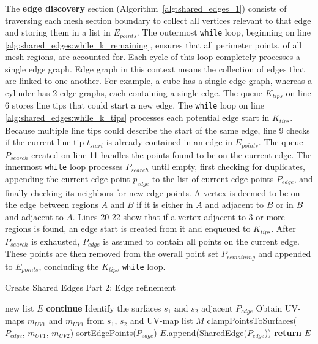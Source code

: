 The \textbf{edge discovery} section (Algorithm~\ref{alg:shared_edges_1}) consists of traversing each mesh section boundary to collect all vertices relevant to that edge and storing them in a list in $E_{points}$.
The outermost \verb|while| loop, beginning on line \ref{alg:shared_edges:while_k_remaining}, ensures that all perimeter points, of all mesh regions, are accounted for.
Each cycle of this loop completely processes a single edge graph.
Edge graph in this context means the collection of edges that are linked to one another.
For example, a cube has a single edge graph, whereas a cylinder has 2 edge graphs, each containing a single edge.
The queue $K_{tips}$ on line 6 stores line tips that could start a new edge.
The \verb|while| loop on line \ref{alg:shared_edges:while_k_tips} processes each potential edge start in $K_{tips}$.
Because multiple line tips could describe the start of the same edge, line 9 checks if the current line tip $t_{start}$ is already contained in an edge in $E_{points}$.
The queue $P_{search}$ created on line 11 handles the points found to be on the current edge.
The innermost \verb|while| loop processes $P_{search}$ until empty, first checking for duplicates, appending the current edge point $p_{edge}$ to the list of current edge points $P_{edge}$, and finally checking its neighbors for new edge points.
A vertex is deemed to be on the edge between regions $A$ and $B$ if it is either in $A$ and adjacent to $B$ or in $B$ and adjacent to $A$.
Lines 20-22 show that if a vertex adjacent to 3 or more regions is found, an edge start is created from it and enqueued to $K_{tips}$.
After $P_{search}$ is exhausted, $P_{edge}$ is assumed to contain all points on the current edge.
These points are then removed from the overall point set $P_{remaining}$ and appended to $E_{points}$, concluding the $K_{tips}$ \verb|while| loop.

\begin{algorithm}[htb]
	\caption{Create Shared Edges Part 2: Edge refinement}\label{alg:shared_edges_2}
\begin{algorithmic}[1]
	\State new list $E$ 
	\label{alg:edge_refinement_for}
			\State \textbf{continue} 
		\EndIf
		\State Identify the surfaces $s_1$ and $s_2$ adjacent $P_{edge}$
		\State Obtain UV-maps $m_{UV1}$ and $m_{UV1}$ from $s_1$, $s_2$ and UV-map list $M$
		\State clampPointsToSurfaces($P_{edge}$, $m_{UV1}$, $m_{UV2}$)\label{alg:edge_refinement_clamp_pts}
		\State sortEdgePoints($P_{edge}$)
		\State $E$.append(SharedEdge($P_{edge}$))
	\EndFor
	\State \textbf{return} $E$
\EndFunction
\end{algorithmic}
\end{algorithm}

